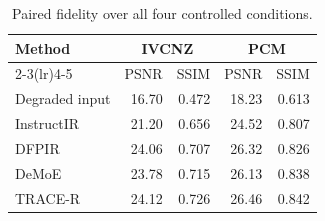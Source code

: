 \begin{table}[!t]
\centering
\caption{Paired fidelity over all four controlled conditions.}
\label{tab:fidelity}
\footnotesize
\setlength{\tabcolsep}{3.7pt}
\begin{tabular}{lrrrr}
\toprule
Method & \multicolumn{2}{c}{IVCNZ} & \multicolumn{2}{c}{PCM} \\
\cmidrule(lr){2-3}\cmidrule(lr){4-5}
& PSNR & SSIM & PSNR & SSIM \\
\midrule
Degraded input & 16.70 & 0.472 & 18.23 & 0.613 \\
InstructIR & 21.20 & 0.656 & 24.52 & 0.807 \\
DFPIR & 24.06 & 0.707 & 26.32 & 0.826 \\
DeMoE & 23.78 & 0.715 & 26.13 & 0.838 \\
TRACE-R & 24.12 & 0.726 & 26.46 & 0.842 \\
\bottomrule
\end{tabular}
\end{table}
